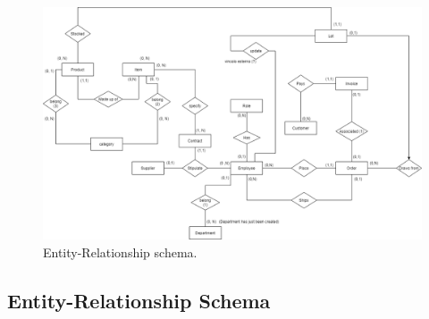 \begin{figure}[!h]
	\centering
	\includegraphics[width=\linewidth,angle=270,origin=c]{ER-Schema.png}
	\caption{Entity-Relationship schema.}
	\label{fig:er-schema}
\end{figure}
\subsection{Entity-Relationship Schema}
